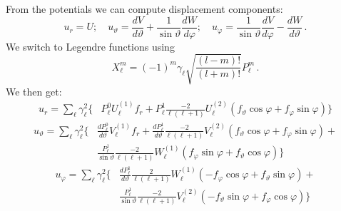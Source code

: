 \documentclass[12pt,a4paper]{article}
\begin{document}
From the potentials we can compute displacement components:
\begin{displaymath}
u_r = U;\quad u_\vartheta = \frac{dV}{d\vartheta}+\frac{1}{\sin\vartheta}\frac{dW}{d\varphi};\quad u_\varphi = \frac{1}{\sin\vartheta}\frac{dV}{d\varphi}-\frac{dW}{d\vartheta} \,.
\end{displaymath}
We switch to Legendre functions using 
\begin{displaymath}
X_\ell^m = (-1)^m \gamma_\ell\sqrt{\frac{(l-m)!}{(l+m)!}} P_\ell^m \,.
\end{displaymath}
We then get:
\begin{align}
u_r = \sum_\ell \gamma_\ell^2 \bigg\{ & P_\ell^0 U_\ell^{(1)}f_r + P_\ell^1\frac{-2}{\ell(\ell+1)}U_\ell^{(2)} \left(f_{\vartheta}\cos\varphi+f_{\varphi}\sin\varphi\right)\bigg\} \nonumber 
\end{align}
\begin{align}
u_\vartheta = \sum_\ell \gamma_\ell^2 \bigg\{ & \frac{dP_\ell^0}{d\vartheta}V_\ell^{(1)}f_{r} + \frac{dP_\ell^1}{d\vartheta}\frac{-2}{\ell(\ell+1)}V_\ell^{(2)} \left(f_{\vartheta}\cos\varphi+f_{\varphi}\sin\varphi\right) + \nonumber \\
& \frac{P_\ell^1}{\sin\vartheta}\frac{-2}{\ell(\ell+1)}W_\ell^{(1)} \left(f_{\varphi}\sin\varphi+f_{\vartheta}\cos\varphi\right)\bigg\} \nonumber
\end{align}
\begin{align}
u_\varphi = \sum_\ell \gamma_\ell^2 \bigg\{ & \frac{dP_\ell^1}{d\vartheta}\frac{2}{\ell(\ell+1)}W_\ell^{(1)} \left(-f_{\varphi}\cos\varphi+f_{\vartheta}\sin\varphi\right) + \nonumber \\
& \frac{P_\ell^1}{\sin\vartheta}\frac{-2}{\ell(\ell+1)}V_\ell^{(2)} \left(-f_{\vartheta}\sin\varphi+f_{\varphi}\cos\varphi\right)\bigg\} \nonumber
\end{align}
\end{document}
